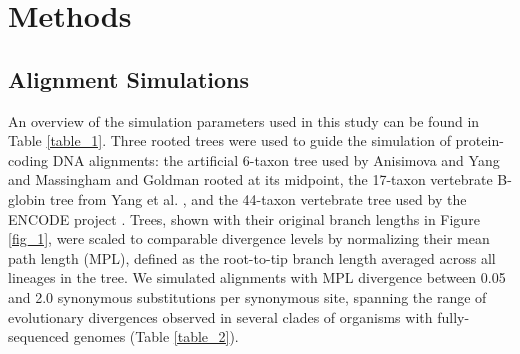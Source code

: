 \documentclass{mbe}
\begin{document}
\section*{Methods}



\subsection*{Alignment Simulations}

An overview of the simulation parameters used in this study can be
found in Table \ref{table_1}. Three rooted trees were used to guide
the simulation of protein-coding DNA alignments: the artificial
6-taxon tree used by Anisimova and Yang
\citeyearpar{Anisimova2001Accuracy} and Massingham and Goldman
\citeyearpar{Massingham2005Detecting} rooted at its midpoint, the
17-taxon vertebrate B-globin tree from Yang et
al. \citeyearpar{Yang2000CodonSubstitution}, and the 44-taxon
vertebrate tree used by the ENCODE project
\citep{2007Identification,Nikolaev2007Early}. Trees, shown with their
original branch lengths in Figure \ref{fig_1}, were scaled to
comparable divergence levels by normalizing their mean path length
(MPL), defined as the root-to-tip branch length averaged across all
lineages in the tree. We simulated alignments with MPL divergence
between 0.05 and 2.0 synonymous substitutions per synonymous site,
spanning the range of evolutionary divergences observed in several
clades of organisms with fully-sequenced genomes (Table
\ref{table_2}).
\end{document}
